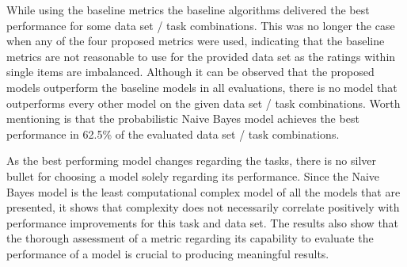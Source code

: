 While using the baseline metrics the baseline algorithms delivered the best performance for some data set / task combinations. This was no longer the case when any of the four proposed metrics were used, indicating that the baseline metrics are not reasonable to use for the provided data set as the ratings within single items are imbalanced. Although it can be observed that the proposed models outperform the baseline models in all evaluations, there is no model that outperforms every other model on the given data set / task combinations. Worth mentioning is that the probabilistic Naive Bayes model achieves the best performance in 62.5\% of the evaluated data set / task combinations. 

As the best performing model changes regarding the tasks, there is no silver bullet for choosing a model solely regarding its performance. 
Since the Naive Bayes model is the least computational complex model of all the models that are presented, it shows that complexity does not necessarily correlate positively with performance improvements for this task and data set.
The results also show that the thorough assessment of a metric regarding its capability to evaluate the performance of a model is crucial to producing meaningful results.

